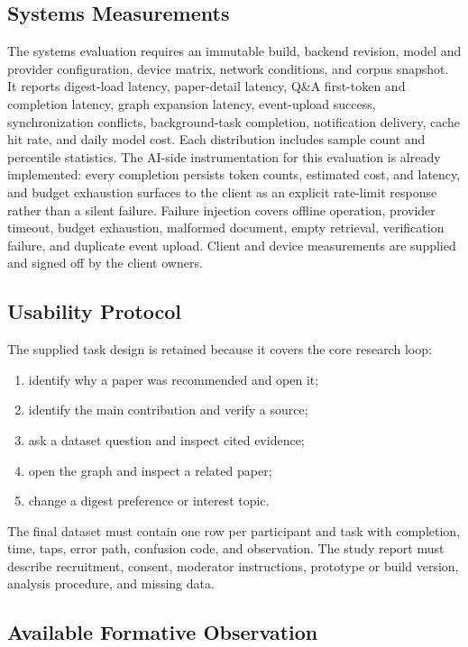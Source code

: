 \subsection{Systems Measurements}

The systems evaluation requires an immutable build, backend revision, model and provider configuration, device matrix, network conditions, and corpus snapshot.
It reports digest-load latency, paper-detail latency, Q\&A first-token and completion latency, graph expansion latency, event-upload success, synchronization conflicts, background-task completion, notification delivery, cache hit rate, and daily model cost.
Each distribution includes sample count and percentile statistics.
The AI-side instrumentation for this evaluation is already implemented: every completion persists token counts, estimated cost, and latency, and budget exhaustion surfaces to the client as an explicit rate-limit response rather than a silent failure.
Failure injection covers offline operation, provider timeout, budget exhaustion, malformed document, empty retrieval, verification failure, and duplicate event upload.
Client and device measurements are supplied and signed off by the client owners.

\subsection{Usability Protocol}

The supplied task design is retained because it covers the core research loop:
\begin{enumerate}
  \item identify why a paper was recommended and open it;
  \item identify the main contribution and verify a source;
  \item ask a dataset question and inspect cited evidence;
  \item open the graph and inspect a related paper;
  \item change a digest preference or interest topic.
\end{enumerate}
The final dataset must contain one row per participant and task with completion, time, taps, error path, confusion code, and observation.
The study report must describe recruitment, consent, moderator instructions, prototype or build version, analysis procedure, and missing data.

\subsection{Available Formative Observation}

